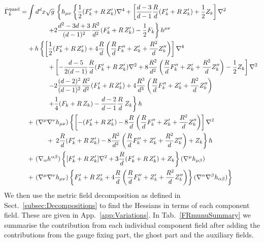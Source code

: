 \documentclass[notitlepage,eqsecnum,bm,amsmath,preprintnumbers,superscriptaddress,nofootinbib,aps,11pt]{revtex4-1}
\begin{document}
\begin{equation}
\begin{split}
\bar\Gamma^{\rm{quad}}_k=&\int d^d x \sqrt{g}\,\left\{  h_{\mu\nu}\left\{  \frac{1}{2}(F_k'+R\,Z_k')\nabla^4
+\left[\frac{d-3}{d-1}\frac{R}{d}(F_k'+R\,Z_k')+\frac{1}{2}Z_k\right] \nabla^2
\right.\right. \\
&\qquad\quad\left.\left.+2\frac{d^2-3d+3}{(d-1)^2}\frac{R^2}{d^2}(F_k'+R\,Z_k')-\frac{1}{2}F_k\right\}h^{\mu\nu}  
\right.\\
&\left.+
\,h \left\{  \left[\frac{1}{2}(F_k'+R\,Z_k')+4\frac{R}{d}\left(\frac{R}{d}F_k''
+Z_k'+\frac{R^2}{d}Z_k''\right)\right]\nabla^4
\right.\right.\\
&\qquad\quad\left.\left.+
\left[-\frac{d-5}{2(d-1)}\frac{R}{d}(F_k'+R\,Z_k')\nabla^2+8\frac{R^2}{d^2}\left(\frac{R}{d}F_k''+Z_k'
+\frac{R^2}{d}Z_k''\right)-\frac{1}{2}Z_k\right]\nabla^2
\right.\right.\\
&\qquad\quad\left.\left.
-2\frac{(d-2)^2}{(d-1)^2}\frac{R^2}{d^2}(F_k'+R\,Z_k')+4\frac{R^3}{d^3}\left(\frac{R}{d}F_k''+Z_k'
+\frac{R^2}{d}Z_k''\right)
\right.\right.\\
&\qquad\quad\left.\left.
+\frac{1}{4}(F_k+R\,Z_k)-\frac{d-2}{d-1}\frac{R}{d}\,Z_k\right\}h
\right.\\
&+\left.(\nabla^{\mu}\nabla^{\nu}h_{\mu\nu}) \left\{ \left[-(F_k'+R\,Z_k')-8\frac{R}{d}\left(\frac{R}{d}F_k''+Z_k'
+\frac{R^2}{d}Z_k''\right)\right]\nabla^2
\right.\right.\\
&\qquad\quad+\left.\left.
2\frac{R}{d}(F_k'+R\,Z_k')-8\frac{R^2}{d^2}\left(\frac{R}{d}F_k''+Z_k'+\frac{R^2}{d}Z_k''\right)
+Z_k\right\}h
\right.\\
&+\left.
(\nabla_{\alpha}h^{\alpha\beta})\left\{[F_k'+R\,Z_k']\nabla^2+3\frac{R}{d}(F_k'+R\,Z_k')+Z_k\right\}
(\nabla^{\mu}h_{\mu\beta})
\right.\\
&+\left. 
(\nabla^{\mu}\nabla^{\nu}h_{\mu\nu})\left\{F_k'+R\,Z_k'+4\frac{R}{d}\left(\frac{R}{d}F_k''
+Z_k'+\frac{R^2}{d}Z_k''\right)\right\}(\nabla^{\alpha}\nabla^{\beta}h_{\alpha\beta})
\right\} \label{SecondVariation}
\end{split}
\end{equation}
 We then use the metric field decomposition as defined in Sect.~\ref{subsec:Decompositions} to find the Hessians in terms of each component field. These are given in App.~\ref{app:Variations}. In Tab.~\ref{FRmunuSummary} we summarise the contribution from each individual component field after adding the contributions from the gauge fixing part, the ghost part and the auxiliary fields. 
\end{document}
